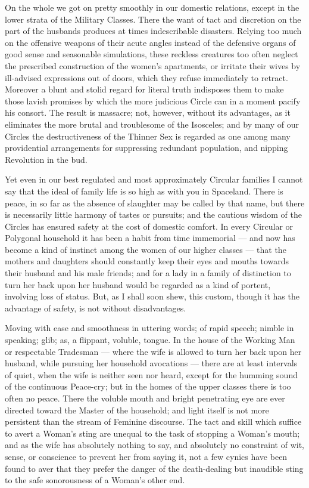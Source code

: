 \documentclass[12pt, a4paper, oneside]{memoir}
\begin{document}
On the whole we got on pretty smoothly in our domestic
relations, except in the lower strata of the Military Classes. There the want
of tact and discretion on the part of the husbands produces at times
indescribable disasters. Relying too much on the offensive weapons of their
acute angles instead of the defensive organs of good sense and seasonable
simulations, these reckless creatures too often neglect the prescribed
construction of the women's apartments, or irritate their wives by ill-advised
expressions out of doors, which they refuse immediately to retract. Moreover a
blunt and stolid regard for literal truth indisposes them to make those lavish
promises by which the more judicious Circle can in a moment pacify his
consort. The result is massacre; not, however, without its advantages, as it
eliminates the more brutal and troublesome of the Isosceles; and by many of
our Circles the destructiveness of the Thinner Sex is regarded as one among
many providential arrangements for suppressing redundant population, and
nipping Revolution in the bud.

Yet even in our best regulated and most approximately Circular families I
cannot say that the ideal of family life is so high as with you in Spaceland.
There is peace, in so far as the absence of slaughter may be called by that
name, but there is necessarily little harmony of tastes or pursuits; and the
cautious wisdom of the Circles has ensured safety at the cost of domestic
comfort. In every Circular or Polygonal household it has been a habit from
time immemorial --- and now has become a kind of instinct among the women of our
higher classes --- that the mothers and daughters should constantly keep their
eyes and mouths towards their husband and his male friends; and for a lady in
a family of distinction to turn her back upon her husband would be regarded as
a kind of portent, involving loss of status. But, as I shall soon shew, this
custom, though it has the advantage of safety, is not without disadvantages.

Moving with ease and smoothness in uttering words; of rapid speech;
nimble in speaking; glib; as, a flippant, voluble, tongue.  In the house of
the Working Man or respectable Tradesman --- where the wife is allowed to turn
her back upon her husband, while pursuing her household avocations --- there are
at least intervals of quiet, when the wife is neither seen nor heard, except
for the humming sound of the continuous Peace-cry; but in the homes of the
upper classes there is too often no peace. There the voluble mouth and bright
penetrating eye are ever directed toward the Master of the household; and
light itself is not more persistent than the stream of Feminine discourse. The
tact and skill which suffice to avert a Woman's sting are unequal to the task
of stopping a Woman's mouth; and as the wife has absolutely nothing to say,
and absolutely no constraint of wit, sense, or conscience to prevent her from
saying it, not a few cynics have been found to aver that they prefer the
danger of the death-dealing but inaudible sting to the safe sonorousness of a
Woman's other end.
\end{document}
